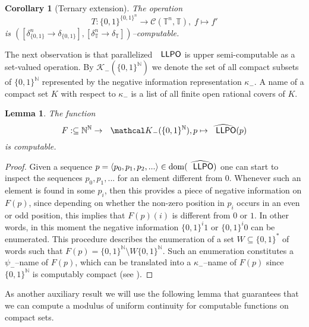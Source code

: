 \documentclass[jsl,10pt]{noasl}
\def\CC{{\mathcal C}}
\def\KK{{\mathcal K}}
\def\IN{{\mathbb{N}}}
\def\IT{{\mathbb{T}}}
\def\In{\subseteq}
\def\dom{{\rm dom}}
\def\LLPO{\text{\rm\sffamily LLPO}}
\def\LLPO{\text{\rm\sffamily LLPO}}
\newtheorem{lemma}[proposition]{Lemma}
\newtheorem{corollary}[proposition]{Corollary}
\begin{document}
\begin{corollary}[Ternary extension]
\label{cor:uniform-ternary}
The operation
\[T:\{0,1\}^{\{0,1\}^n}\to\CC(\IT^n,\IT),\;f\mapsto f'\]
is $([\delta_{\{0,1\}}^n\to\delta_{\{0,1\}}],[\delta_\IT^n\to\delta_\IT])$--computable.
\end{corollary}

The next observation is that parallelized $\LLPO$ is upper semi-computable
as a set-valued operation. By $\KK_-(\{0,1\}^\IN)$ we denote the set of
all compact subsets of $\{0,1\}^\IN$ represented by the negative information
representation $\kappa_-$. A name of a compact set $K$ with respect to $\kappa_-$
is a list of all finite open rational covers of $K$. 

\begin{lemma}
\label{lem:compact-LLPO}
The function 
\[F:\In\IN^\IN\to\KK_-(\{0,1\}^\IN),p\mapsto\widehat{\LLPO}(p)\]
is computable.
\end{lemma}
\begin{proof}
Given a sequence $p=\langle p_0,p_1,p_2,...\rangle\in\dom(\widehat{\LLPO})$
one can start to inspect the sequences $p_0,p_1,...$ for an element different
from $0$. Whenever such an element is found in some $p_i$, then this provides
a piece of negative information on $F(p)$, since depending on whether the
non-zero position in $p_i$ occurs in an even or odd position, this implies
that $F(p)(i)$ is different from $0$ or $1$. In other words, in this moment
the negative information $\{0,1\}^i1$ or $\{0,1\}^i0$ can be enumerated.
This procedure describes the enumeration of a set $W\In\{0,1\}^*$ of words
such that $F(p)=\{0,1\}^\IN\setminus W\{0,1\}^\IN$. Such an enumeration
constitutes a $\psi_-$--name of $F(p)$, which can be translated into 
a $\kappa_-$--name of $F(p)$ since $\{0,1\}^\IN$ is computably compact
(see \cite{BP03}).
\end{proof}

As another auxiliary result we will use the following lemma
that guarantees that we can compute a modulus of uniform continuity
for computable functions on compact sets.
\end{document}
